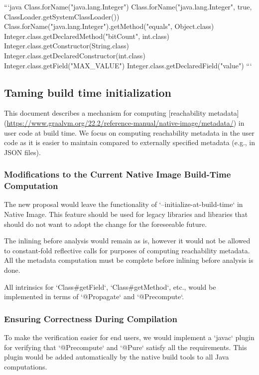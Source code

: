 ```java
Class.forName("java.lang.Integer")
Class.forName("java.lang.Integer", true, ClassLoader.getSystemClassLoader())
Class.forName("java.lang.Integer").getMethod("equals", Object.class)
Integer.class.getDeclaredMethod("bitCount", int.class)
Integer.class.getConstructor(String.class)
Integer.class.getDeclaredConstructor(int.class)
Integer.class.getField("MAX\_VALUE")
Integer.class.getDeclaredField("value")
```

\subsection{Taming build time initialization}

This document describes a mechanism for computing [reachability metadata](\url{https://www.graalvm.org/22.2/reference-manual/native-image/metadata/}) in user code at build time. We focus on computing reachability metadata in the user code as it is easier to maintain compared to externally specified metadata (e.g., in JSON files).

\subsubsection{Modifications to the Current Native Image Build-Time Computation}

The new proposal would leave the functionality of `--initialize-at-build-time` in Native Image.
This feature should be used for legacy libraries and libraries that 
should do not want to adopt the change for the foreseeable future.

The inlining before analysis would remain as is, however 
it would not be allowed to constant-fold reflective calls for purposes 
of computing reachability metadata.
All the metadata computation must be complete before inlining before 
analysis is done.

All intrinsics for `Class#getField`, `Class#getMethod`, etc., would be implemented in terms of `@Propagate` and `@Precompute`.

\subsubsection{Ensuring Correctness During Compilation}

To make the verification easier for end users, we would implement a `javac` plugin for verifying that `@Precompute` and `@Pure` satisfy all the requirements. This plugin would be added automatically by the native build tools to all Java computations.

